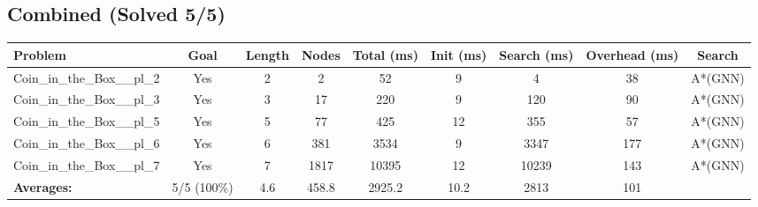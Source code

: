 \documentclass{article}
\begin{document}
\subsection*{Combined (Solved 5/5)}
\begin{tabular}{lcccccccc}
\toprule
Problem & Goal & Length & Nodes & Total (ms) & Init (ms) & Search (ms) & Overhead (ms) & Search \\
\midrule
Coin\_in\_the\_Box\_\_pl\_2 & Yes & 2 & 2 & 52 & 9 & 4 & 38 & A*(GNN) \\
Coin\_in\_the\_Box\_\_pl\_3 & Yes & 3 & 17 & 220 & 9 & 120 & 90 & A*(GNN) \\
Coin\_in\_the\_Box\_\_pl\_5 & Yes & 5 & 77 & 425 & 12 & 355 & 57 & A*(GNN) \\
Coin\_in\_the\_Box\_\_pl\_6 & Yes & 6 & 381 & 3534 & 9 & 3347 & 177 & A*(GNN) \\
Coin\_in\_the\_Box\_\_pl\_7 & Yes & 7 & 1817 & 10395 & 12 & 10239 & 143 & A*(GNN) \\
\textbf{Averages:} & 5/5 (100\%) & 4.6 & 458.8 & 2925.2 & 10.2 & 2813 & 101 & \\
\bottomrule
\end{tabular}
\\[0.7cm]
\end{document}
